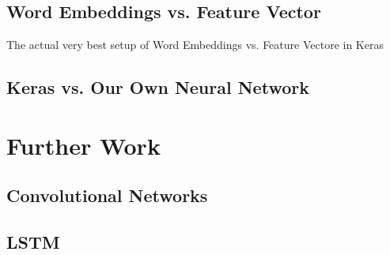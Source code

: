 \documentclass[11pt,onecolumn]{article} %
\begin{document}
\subsection{Word Embeddings vs. Feature Vector}
The actual very best setup of Word Embeddings vs. Feature Vectore in Keras

\subsection{Keras vs. Our Own Neural Network}

\section{Further Work}

\subsection{Convolutional Networks}

\subsection{LSTM}

\end{document}
